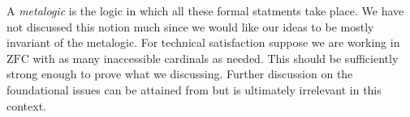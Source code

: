\begin{remark}
    A \emph{metalogic} is the logic in which all these formal statments take place. We have not discussed this notion much since we would like our ideas to be mostly invariant of the metalogic. For technical satisfaction suppose we are working in $\mathrm{ZFC}$ with as many inaccessible cardinals as needed. This should be sufficiently strong enough to prove what we discussing. Further discussion on the foundational issues can be attained from \cite{2008arXiv0810.1279S, 2019arXiv190407004S, 2012arXiv1211.2851K} but is ultimately irrelevant in this context.
\end{remark}



